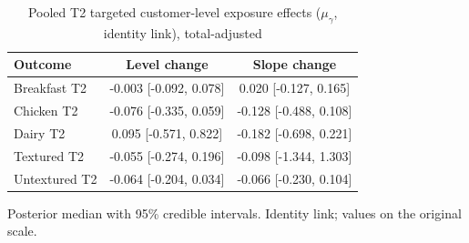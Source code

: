 \begin{table}[H]
\centering
\caption{Pooled T2 targeted customer-level exposure effects ($\mu_\gamma$, identity link), total-adjusted}
\label{tab:a6_t2_mu_gamma_adj}
\begin{tabular}{lcc}
\toprule
Outcome & Level change & Slope change \\
\midrule
Breakfast T2 & -0.003 [-0.092, 0.078] & 0.020 [-0.127, 0.165] \\
Chicken T2 & -0.076 [-0.335, 0.059] & -0.128 [-0.488, 0.108] \\
Dairy T2 & 0.095 [-0.571, 0.822] & -0.182 [-0.698, 0.221] \\
Textured T2 & -0.055 [-0.274, 0.196] & -0.098 [-1.344, 1.303] \\
Untextured T2 & -0.064 [-0.204, 0.034] & -0.066 [-0.230, 0.104] \\
\bottomrule
\end{tabular}
\par\smallskip\footnotesize Posterior median with 95\% credible intervals. Identity link; values on the original scale.
\end{table}
